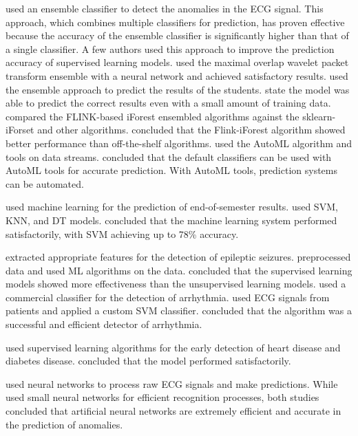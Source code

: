\documentclass[a4paper,fleqn]{cas-dc}
\begin{document}
\cite*{24_rp} used an ensemble classifier to detect the anomalies in the ECG signal. This approach, which combines multiple classifiers for prediction, has proven effective because the accuracy of the ensemble classifier is significantly higher than that of a single classifier. A few authors used this approach to improve the prediction accuracy of supervised learning models. \cite*{10_rp} used the maximal overlap wavelet packet transform ensemble with a neural network and achieved satisfactory results. \cite*{20_rp} used the ensemble approach to predict the results of the students. \citeauthor{20_rp} state the model was able to predict the correct results even with a small amount of training data. \cite*{16_rp} compared the FLINK-based iForest ensembled algorithms against the sklearn-iForset and other algorithms. \citeauthor{16_rp} concluded that the Flink-iForest algorithm showed better performance than off-the-shelf algorithms. \cite*{11_rp} used the AutoML algorithm and tools on data streams. \citeauthor{11_rp} concluded that the default classifiers can be used with AutoML tools for accurate prediction. With AutoML tools, prediction systems can be automated.

\cite*{ref_paper_m1} used machine learning for the prediction of end-of-semester results. \cite*{ref_paper_m1} used SVM, KNN, and DT models. \cite*{ref_paper_m1} concluded that the machine learning system performed satisfactorily, with SVM achieving up to 78\% accuracy.

\cite*{23_rp} extracted appropriate features for the detection of epileptic seizures. \citeauthor{23_rp} preprocessed data and used ML algorithms on the data. \citeauthor{23_rp} concluded that the supervised learning models showed more effectiveness than the unsupervised learning models. \cite*{12_rp} used a commercial classifier for the detection of arrhythmia. \citeauthor{12_rp} used ECG signals from patients and applied a custom SVM classifier. \citeauthor{12_rp} concluded that the algorithm was a successful and efficient detector of arrhythmia.

\cite*{ref_paper_m2} used supervised learning algorithms for the early detection of heart disease and diabetes disease. \cite*{ref_paper_m2} concluded that the model performed satisfactorily.

\cite*{09_rp} used neural networks to process raw ECG signals and make predictions. While \cite*{22_rp} used small neural networks for efficient recognition processes, both studies concluded that artificial neural networks are extremely efficient and accurate in the prediction of anomalies.
\end{document}
